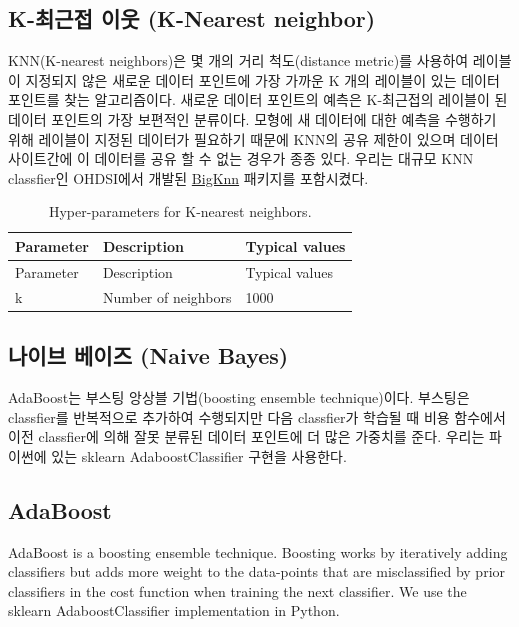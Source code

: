 \documentclass[11pt]{book}
\theoremstyle{definition}
\theoremstyle{definition}
\theoremstyle{definition}
\theoremstyle{remark}
\begin{document}
\subsection{K-최근접 이웃 (K-Nearest
neighbor)}\label{k---k-nearest-neighbor}

KNN(K-nearest neighbors)은 몇 개의 거리 척도(distance metric)를 사용하여
레이블이 지정되지 않은 새로운 데이터 포인트에 가장 가까운 K 개의
레이블이 있는 데이터 포인트를 찾는 알고리즘이다. 새로운 데이터 포인트의
예측은 K-최근접의 레이블이 된 데이터 포인트의 가장 보편적인 분류이다.
모형에 새 데이터에 대한 예측을 수행하기 위해 레이블이 지정된 데이터가
필요하기 때문에 KNN의 공유 제한이 있으며 데이터 사이트간에 이 데이터를
공유 할 수 없는 경우가 종종 있다. 우리는 대규모 KNN classfier인
OHDSI에서 개발된 \href{https://github.com/OHDSI/BigKnn}{BigKnn} 패키지를
포함시켰다. 

\begin{longtable}[]{@{}lll@{}}
\caption{\label{tab:knnParameters} Hyper-parameters for K-nearest
neighbors.}\tabularnewline
\toprule
Parameter & Description & Typical values\tabularnewline
\midrule
\endfirsthead
\toprule
Parameter & Description & Typical values\tabularnewline
\midrule
\endhead
k & Number of neighbors & 1000\tabularnewline
\bottomrule
\end{longtable}

\subsection{나이브 베이즈 (Naive Bayes)}\label{--naive-bayes}

AdaBoost는 부스팅 앙상블 기법(boosting ensemble technique)이다. 부스팅은
classfier를 반복적으로 추가하여 수행되지만 다음 classfier가 학습될 때
비용 함수에서 이전 classfier에 의해 잘못 분류된 데이터 포인트에 더 많은
가중치를 준다. 우리는 파이썬에 있는 sklearn AdaboostClassifier 구현을
사용한다. 

\subsection{AdaBoost}\label{adaboost}

AdaBoost is a boosting ensemble technique. Boosting works by iteratively
adding classifiers but adds more weight to the data-points that are
misclassified by prior classifiers in the cost function when training
the next classifier. We use the sklearn AdaboostClassifier
implementation in Python.  
\end{document}
